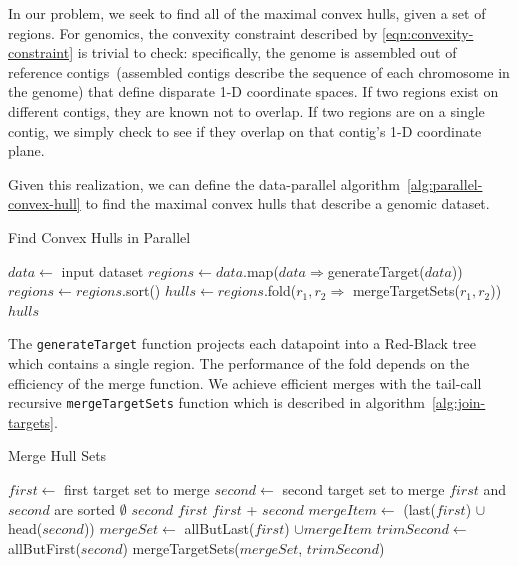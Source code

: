 \documentclass{sig-alternate}
\begin{document}
In our problem, we seek to find all of the maximal convex hulls, given a set of regions. For genomics, the
convexity constraint described by \eqref{eqn:convexity-constraint} is trivial to check: specifically, the
genome is assembled out of reference contigs~(assembled contigs describe the sequence of each
chromosome in the genome) that define disparate 1-D coordinate spaces. If two regions exist on different contigs,
they are known not to overlap. If two regions are on a single contig, we simply check to see if they overlap
on that contig's 1-D coordinate plane.

Given this realization, we can define the data-parallel algorithm~\ref{alg:parallel-convex-hull} to find the
maximal convex hulls that describe a genomic dataset.

\begin{algorithm}
\caption{Find Convex Hulls in Parallel}
\label{alg:parallel-convex-hull}
\begin{algorithmic}
\STATE $data \leftarrow$ input dataset
\STATE $regions \leftarrow data$.map($data \Rightarrow $generateTarget($data$))
\STATE $regions \leftarrow regions$.sort()
\STATE $hulls \leftarrow regions$.fold($r_1, r_2 \Rightarrow$ mergeTargetSets($r_1, r_2$))
\RETURN $hulls$
\end{algorithmic}
\end{algorithm}

The \texttt{generateTarget} function projects each datapoint into a Red-Black tree which contains a
single region. The performance of the fold depends on the efficiency of the merge function. We achieve
efficient merges with the tail-call recursive \texttt{mergeTargetSets} function which is described in
algorithm~\ref{alg:join-targets}.

\begin{algorithm}
\caption{Merge Hull Sets}
\label{alg:join-targets}
\begin{algorithmic}
\STATE $first \leftarrow$ first target set to merge
\STATE $second \leftarrow$ second target set to merge
\REQUIRE $first$ and $second$ are sorted
\RETURN $\emptyset$
\RETURN $second$
\RETURN $first$
\ELSE
{}
\RETURN $first$ + $second$
\ELSE
\STATE $mergeItem \leftarrow$ (last($first$) $\cup$ head($second$))
\STATE $mergeSet \leftarrow$ allButLast($first$) $\cup mergeItem$
\STATE $trimSecond \leftarrow$ allButFirst($second$)
\RETURN mergeTargetSets($mergeSet$, $trimSecond$)
\ENDIF
\ENDIF
\end{algorithmic}
\end{algorithm}
\end{document}
